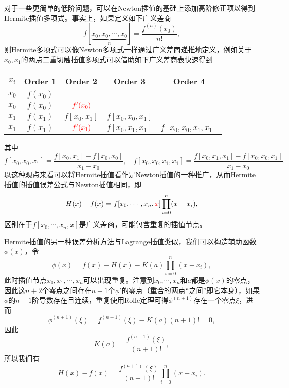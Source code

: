 \documentclass[a4paper,10pt]{ctexart}
\begin{document}
对于一些更简单的低阶问题，可以在Newton插值的基础上添加高阶修正项以得到Hermite插值多项式。事实上，如果定义如下广义差商
\begin{equation}
    f[\underbrace{x_0,x_0,\cdots ,x_0}_n] = \frac{f^{(n)}(x_0)}{n!},
\end{equation}
则Hermite多项式可以像Newton多项式一样通过广义差商递推地定义，例如关于$ x_0,x_1 $的两点二重切触插值多项式可以借助如下广义差商表快速得到
\begin{center}
    \begin{tabular}{ccccc}
        \toprule
        $ x_i $ & Order 1 & Order 2 & Order 3 & Order 4 \\
        \midrule
        $ x_0 $ & $ f(x_0) $ &  &  &\\
        $ x_0 $ & $ f(x_0) $ & $ \textcolor{red}{f'(x_0)} $ &  & \\
        $ x_1 $ & $ f(x_1) $ & $ f[x_0,x_1] $ & $ f[x_0,x_0,x_1] $ &\\
        $ x_1 $ & $ f(x_1) $ & $ \textcolor{red}{f'(x_1)} $ & $ f[x_0,x_1,x_1] $ & $ f[x_0,x_0,x_1,x_1] $\\
        \bottomrule
    \end{tabular}
\end{center}
其中
\[
    f[x_0,x_0,x_1] = \frac{f[x_0,x_1]-f[x_0,x_0]}{x_1-x_0},\quad f[x_0,x_0,x_1,x_1] = \frac{f[x_0,x_1,x_1]-f[x_0,x_0,x_1]}{x_1-x_0}.
\]
以这种观点来看可以将Hermite插值看作是Newton插值的一种推广，从而Hermite插值的插值误差公式与Newton插值相同，即
\begin{equation}
    H(x)-f(x)=f[x_0,\cdots ,x_n,\textcolor{red}{x}] \prod_{i=0}^{n}(x-x_i),
\end{equation}
区别在于$ f[x_0,\cdots ,x_n,x] $是广义差商，可能包含重复的插值节点。

Hermite插值的另一种误差分析方法与Lagrange插值类似，我们可以构造辅助函数$ \phi(x) $，令
\begin{equation}
    \phi(x)=f(x)-H(x)-K(a)\prod_{i=0}^{n}(x-x_i),
\end{equation}
此时插值节点$ x_0,x_1,\cdots ,x_n $可以出现重复。注意到$ x_0,\cdots ,x_n $和$ a $都是$ \phi(x) $的零点，因此这$ n+2 $个零点之间存在$ n+1 $个$ \phi' $的零点（重合的两点“之间”即它本身），如果$ \phi $的$ n+1 $阶导数存在且连续，重复使用Rolle定理可得$ \phi^{(n+1)} $存在一个零点$ \xi $，进而
\begin{equation}
    \phi^{(n+1)}(\xi)=f^{(n+1)}(\xi)-K(a)(n+1)!=0,
\end{equation}
因此
\begin{equation}
    K(a) = \frac{f^{(n+1)}(\xi)}{(n+1)!},
\end{equation}
所以我们有
\begin{equation}
    H(x)-f(x)=\frac{f^{(n+1)}(\xi)}{(n+1)!}\prod_{i=0}^{n}(x-x_i).
\end{equation}
\end{document}
